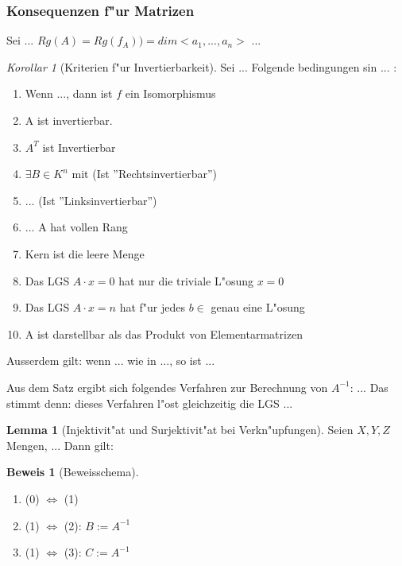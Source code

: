 \documentclass[11pt]{article}
\theoremstyle{remark}
\theoremstyle{definition}
\newtheorem{prof}{Beweis}
\newtheorem*{lemma}{Lemma}
\theoremstyle{remark}
\newtheorem*{korollar}{Korollar}
\begin{document}
\subsubsection{Konsequenzen f"ur Matrizen}
\label{sec:konsma}

Sei ...
$Rg(A)=Rg(f_A))=dim<a_1,...,a_n>$ ...

\begin{korollar}[Kriterien f"ur Invertierbarkeit]
  Sei ... Folgende bedingungen sin ... :
  \begin{enumerate}
  \item Wenn ..., dann ist $f$ ein Isomorphismus
  \item A ist invertierbar.
  \item $A^T$ ist Invertierbar
  \item $\exists B\in K^n$ mit (Ist ''Rechtsinvertierbar'')
  \item ... (Ist ''Linksinvertierbar'')
  \item ... A hat vollen Rang
  \item Kern ist die leere Menge
  \item Das LGS $A\cdot x = 0$ hat nur die triviale L"osung $x=0$
  \item Das LGS $A\cdot x = n$ hat f"ur jedes $b\in $ genau eine L"osung
  \item A ist darstellbar als das Produkt von Elementarmatrizen
  \end{enumerate}

  Ausserdem gilt: wenn ... wie in ..., so ist ... 
\end{korollar}

Aus dem Satz ergibt sich folgendes Verfahren zur Berechnung von $A^{-1}$: ...
Das stimmt denn: dieses Verfahren l"ost gleichzeitig die LGS ...

\begin{lemma}[Injektivit"at und Surjektivit"at bei Verkn"upfungen]
  Seien $X,Y,Z$ Mengen, ... Dann gilt:  
\end{lemma}

\begin{prof}[Beweisschema]
  \begin{enumerate}
  \item (0) $ \iff $ (1)
  \item (1) $ \iff $ (2): $B:=A^{-1}$
  \item (1) $ \iff $ (3): $C:=A^{-1}$
  \end{enumerate}
\end{prof}
\end{document}
